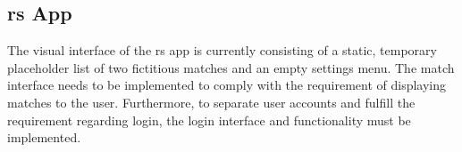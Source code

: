 \subsection{\gls{rs} App}
The visual interface of the \gls{rs} app is currently consisting of a static, temporary placeholder list of two fictitious matches and an empty settings menu.
The match interface needs to be implemented to comply with the requirement of displaying matches to the user. 
Furthermore, to separate user accounts and fulfill the requirement regarding login, the login interface and functionality must be implemented.
